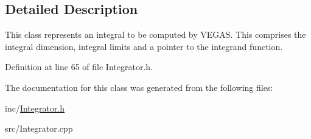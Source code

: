 \subsection{Detailed Description}
This class represents an integral to be computed by V\+E\+G\+A\+S. This comprises the integral dimension, integral limits and a pointer to the integrand function. 

Definition at line 65 of file Integrator.\+h.



The documentation for this class was generated from the following files\+:\begin{DoxyCompactItemize}
\item 
inc/\hyperlink{Integrator_8h}{Integrator.\+h}\item 
src/Integrator.\+cpp\end{DoxyCompactItemize}
